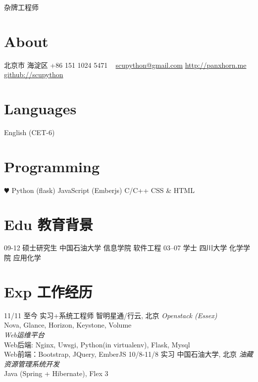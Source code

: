 \documentclass[]{friggeri-cv}
\begin{document}
       {{\color{orange}杂}牌工程师}


\begin{aside}
  \section{About}
    北京市 海淀区
    +86 151 1024 5471
    ~
    \href{mailto:scupython@gmail.com}{scupython@gmail.com}
    \href{http://panxhorn.me}{http://panxhorn.me}
    \href{https://github.com/scupython/}{github://scupython}
  \section{Languages}
    English (CET-6)
  \section{Programming}
    {\color{red} $\varheartsuit$} Python (flask)
    JavaScript (Emberjs)
    C/C++ 
    CSS \& HTML
\end{aside}

\section{Edu 教育背景}

\begin{entrylist}
  \entry
    {09-12}
    {硕士研究生}
    {中国石油大学 信息学院}
    {软件工程}
  \entry
    {03–07}
    {学士}
    {四川大学 化学学院}
    {应用化学}
\end{entrylist}

\section{Exp 工作经历}

\begin{entrylist}
  \entry
    {11/11 至今}
    {实习+系统工程师}
    {智明星通/行云, 北京}
    {\emph{Openstack (Essex)}\\
      Nova, Glance, Horizon, Keystone, Volume\\
      \emph{Web运维平台}\\
      Web后端: Nginx, Uwsgi, Python(in virtualenv), Flask, Mysql \\
      Web前端：Bootstrap, JQuery, EmberJS
    }
  \entry
    {10/8-11/8}
    {实习}
    {中国石油大学, 北京}
    {\emph{油藏资源管理系统开发}\\
      Java (Spring + Hibernate), Flex 3
    }
\end{entrylist}
\end{document}
